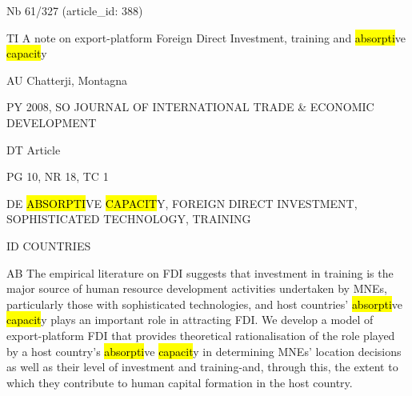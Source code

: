 \documentclass[a4paper]{article}
\begin{document}
\vspace*{-2cm}
Nb \tabto{0cm}61/327 (article\_id: 388)\par
TI \tabto{0cm}A note on export-platform Foreign Direct Investment, training and \hl{absorpti}ve \hl{capacit}y\par
AU \tabto{0cm}Chatterji, Montagna\par
PY \tabto{0cm}2008, SO JOURNAL OF INTERNATIONAL TRADE \& ECONOMIC DEVELOPMENT\par
DT \tabto{0cm}Article\par
PG \tabto{0cm}10, NR 18, TC 1\par
DE \tabto{0cm}\hl{ABSORPTI}VE \hl{CAPACIT}Y, FOREIGN DIRECT INVESTMENT, SOPHISTICATED TECHNOLOGY, TRAINING\par
ID \tabto{0cm}COUNTRIES\par
AB \tabto{0cm}The empirical literature on FDI suggests that investment in training is the major source of human resource development activities undertaken by MNEs, particularly those with sophisticated technologies, and host countries' \hl{absorpti}ve \hl{capacit}y plays an important role in attracting FDI. We develop a model of export-platform FDI that provides theoretical rationalisation of the role played by a host country's \hl{absorpti}ve \hl{capacit}y in determining MNEs' location decisions as well as their level of investment and training-and, through this, the extent to which they contribute to human capital formation in the host country.\par
\clearpage
\end{document}

